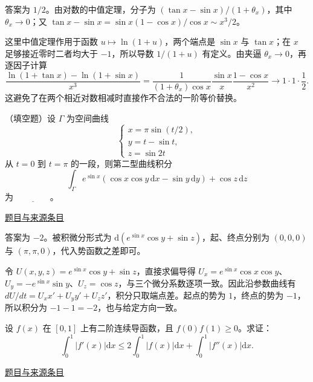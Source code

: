 \documentclass[UTF8,12pt,a4paper,fontset=fandol]{ctexart}
\begin{document}
\begin{solve}\label{ans:fin09-hi:2}

答案为 $1/2$。由对数的中值定理，分子为 $(\tan x-\sin x)/(1+\theta_x)$，其中 $\theta_x\to0$；又 $\tan x-\sin x=\sin x(1-\cos x)/\cos x\sim x^3/2$。

这里中值定理作用于函数 $u\mapsto\ln(1+u)$，两个端点是 $\sin x$ 与 $\tan x$；在 $x$ 足够接近零时二者均大于 $-1$，所以导数 $1/(1+u)$ 有定义。由夹逼 $\theta_x\to0$，再逐因子计算
\[
\frac{\ln(1+\tan x)-\ln(1+\sin x)}{x^3}
=\frac1{(1+\theta_x)\cos x}\frac{\sin x}{x}\frac{1-\cos x}{x^2}
\longrightarrow1\cdot1\cdot\frac12.
\]
这避免了在两个相近对数相减时直接作不合法的一阶等价替换。

\end{solve}

\begin{example}[来源序号3]\label{ex:fin09-hi:3}\label{pr:fin09-hi:3}

（填空题）设 $\Gamma$ 为空间曲线
\[
\begin{cases} x=\pi \sin\left(t/2\right), \\ y=t-\sin t, \\ z=\sin 2t \end{cases}
\]
从 $t=0$ 到 $t=\pi$ 的一段，则第二型曲线积分
\[
\int_{\Gamma} e^{\sin x}\left(\cos x \cos y\, \mathrm{d} x-\sin y\, \mathrm{d} y\right)+\cos z\, \mathrm{d} z
\]
为 $\underline{\qquad\qquad}$。

\par\href{https://github.com/lzxcr/cmc-mathematics/blob/64916fa1fdbc3e444a652eca204d5669058ee321/src/problems/finals/09/03.md}{题目与来源条目}

\end{example}

\begin{solve}\label{ans:fin09-hi:3}

答案为 $-2$。被积微分形式为 $\mathrm d(e^{\sin x}\cos y+\sin z)$，起、终点分别为 $(0,0,0)$ 与 $(\pi,\pi,0)$，代入势函数之差即可。

令 $U(x,y,z)=e^{\sin x}\cos y+\sin z$，直接求偏导得 $U_x=e^{\sin x}\cos x\cos y$、$U_y=-e^{\sin x}\sin y$、$U_z=\cos z$，与三个微分系数逐项一致。因此沿参数曲线有 $dU/dt=U_xx'+U_yy'+U_zz'$，积分只取端点差。起点的势为 $1$，终点的势为 $-1$，所以积分为 $-1-1=-2$，也与给定方向一致。

\end{solve}

\begin{example}[来源序号7]\label{ex:fin09-hi:7}\label{pr:fin09-hi:7}

设 $f(x)$ 在 $[0, 1]$ 上有二阶连续导函数，且 $f(0)f(1) \geq 0$。求证：
\[
\int_0^1 \left|f'(x)\right| \mathrm{d}x \leq 2 \int_0^1 |f(x)| \mathrm{d}x + \int_0^1 \left|f''(x)\right| \mathrm{d}x.
\]

\par\href{https://github.com/lzxcr/cmc-mathematics/blob/64916fa1fdbc3e444a652eca204d5669058ee321/src/problems/finals/09/07.md}{题目与来源条目}

\end{example}
\end{document}
